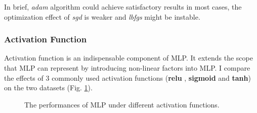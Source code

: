\documentclass[12pt,a4paper]{article}
\theoremstyle{definition}
\begin{document}
\vspace{0.01\linewidth}
In brief, \textit{adam} algorithm could achieve satisfactory results in most cases, the optimization effect of \textit{sgd} is weaker and \textit{lbfgs} might be instable.

\subsubsection{Activation Function}

Activation function is an indispensable component of MLP. It extends the scope that MLP can represent by introducing non-linear factors into MLP. I compare the effects of 3 commonly used activation functions (\textbf{relu} \cite{relu}, \textbf{sigmoid} and \textbf{tanh}) on the two datasets (Fig. \ref{fig:mlp-activation}).

\begin{figure}[H]
	\centering
	\caption{The performances of MLP under different activation functions.}
	\label{fig:mlp-activation}
\end{figure}
\end{document}
